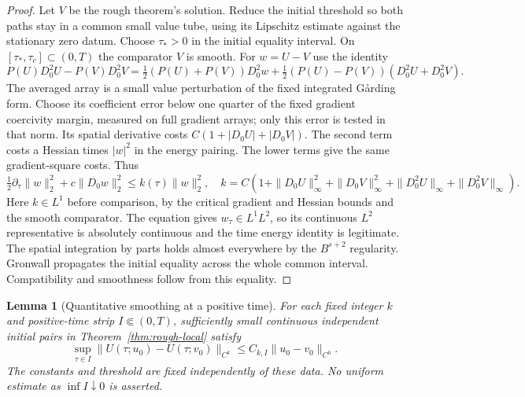 \documentclass[11pt]{article}
\numberwithin{equation}{section}
\newtheorem{lemma}[theorem]{Lemma}
\theoremstyle{definition}
\theoremstyle{remark}
\begin{document}
\begin{proof}
Let $V$ be the rough theorem's solution. Reduce the
initial threshold so both paths stay in a common small
value tube, using its Lipschitz estimate against the
stationary zero datum. Choose $\tau_*>0$ in the initial
equality interval. On $[\tau_*,\tau_c]\subset(0,T)$ the
comparator $V$ is smooth. For $w=U-V$ use the identity
\[
 P(U)D_0^2U-P(V)D_0^2V
 =\tfrac12(P(U)+P(V))D_0^2w
      +\tfrac12(P(U)-P(V))(D_0^2U+D_0^2V).
\]
The averaged array is a small value perturbation of
the fixed integrated G{\aa}rding form. Choose its
coefficient error below one quarter of the fixed
gradient coercivity margin, measured on full gradient
arrays; only this error is tested in that norm. Its spatial
derivative costs $C(1+|D_0U|+|D_0V|)$.
The second term costs a Hessian times $|w|^2$
in the energy pairing. The lower terms give the
same gradient-square costs. Thus
\[
 \tfrac12\partial_\tau\|w\|_2^2
       +c\|D_0w\|_2^2\le k(\tau)\|w\|_2^2,
\quad
 k=C(1+\|D_0U\|_\infty^2+\|D_0V\|_\infty^2
                +\|D_0^2U\|_\infty+\|D_0^2V\|_\infty).
\]
Here $k\in L^1$ before comparison, by the critical
gradient and Hessian bounds and the smooth comparator.
The equation gives $w_\tau\in L^1L^2$, so its continuous
$L^2$ representative is absolutely continuous and
the time energy identity is legitimate. The spatial
integration by parts holds almost everywhere by
the $B^{s+2}$ regularity. Gronwall propagates the
initial equality across the whole common interval.
Compatibility and smoothness follow from this equality.
\end{proof}

\begin{lemma}[Quantitative smoothing at a positive time]
\label{lem:quantitative-smoothing}
For each fixed integer $k$ and positive-time strip
$I\Subset(0,T)$, sufficiently small continuous
independent initial pairs in Theorem~\ref{thm:rough-local}
satisfy
\[
 \sup_{\tau\in I}\|U(\tau;u_0)-U(\tau;v_0)\|_{C^k}
       \le C_{k,I}\|u_0-v_0\|_{C^0}.
\]
The constants and threshold are fixed independently of
these data. No uniform estimate as $\inf I\downarrow0$
is asserted.
\end{lemma}
\end{document}
